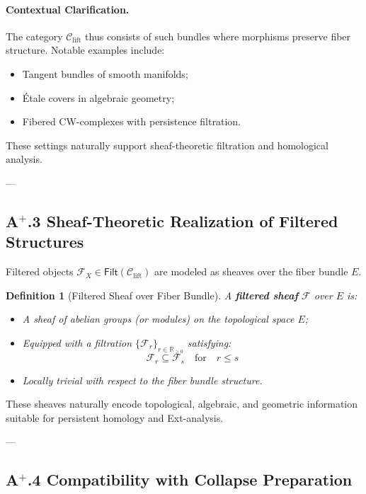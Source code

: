 \documentclass[11pt]{article}
\newtheorem{definition}[theorem]{Definition}
\begin{document}
\paragraph{Contextual Clarification.}
The category \( \mathcal{C}_{\mathrm{lift}} \) thus consists of such bundles where morphisms preserve fiber structure. Notable examples include:
\begin{itemize}
  \item Tangent bundles of smooth manifolds;
  \item Étale covers in algebraic geometry;
  \item Fibered CW-complexes with persistence filtration.
\end{itemize}
These settings naturally support sheaf-theoretic filtration and homological analysis.

---

\subsection*{A$^{+}$.3 Sheaf-Theoretic Realization of Filtered Structures}

Filtered objects $\mathcal{F}_X \in \mathsf{Filt}(\mathcal{C}_{\mathrm{lift}})$ are modeled as sheaves over the fiber bundle $E$.

\begin{definition}[Filtered Sheaf over Fiber Bundle]
A \textbf{filtered sheaf} $\mathcal{F}$ over $E$ is:

\begin{itemize}
    \item A sheaf of abelian groups (or modules) on the topological space $E$;
    \item Equipped with a filtration $\{ \mathcal{F}_r \}_{r \in \mathbb{R}_{\geq 0}}$ satisfying:
    \[
    \mathcal{F}_r \subseteq \mathcal{F}_s \quad \text{for} \quad r \leq s
    \]
    \item Locally trivial with respect to the fiber bundle structure.
\end{itemize}
\end{definition}

These sheaves naturally encode topological, algebraic, and geometric information suitable for persistent homology and Ext-analysis.

---

\subsection*{A$^{+}$.4 Compatibility with Collapse Preparation}
\end{document}
